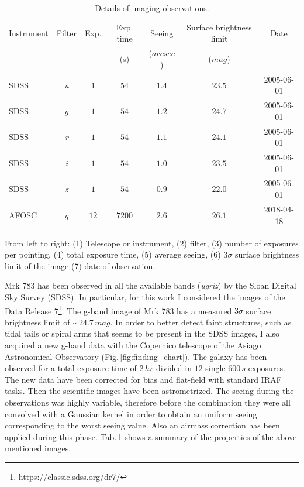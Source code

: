 \documentclass[../main.tex]{subfiles}
\begin{document}
\begin{table}
    \centering
    \caption{Details of imaging observations.}
    \label{tab:obs_image}
    \begin{threeparttable}
    \begin{tabular}{lcccccc}
    \hline
    \hline
    Instrument& Filter & Exp.& Exp. time & Seeing & Surface brightness limit & Date \\
    & & & (s) & ($\si{arcsec}$)& ($\si{mag}$)&\\   
    \hline
    SDSS &\emph{u}&$1$ &$54$ &$1.4$&$23.5$&2005-06-01\\
    SDSS &\emph{g}&$1$ &$54$ &$1.2$&$24.7$&2005-06-01\\
    SDSS &\emph{r}&$1$ &$54$ &$1.1$&$24.1$&2005-06-01\\
    SDSS &\emph{i}&$1$ &$54$ &$1.0$&$23.5$&2005-06-01\\
    SDSS &\emph{z}&$1$ &$54$ &$0.9$&$22.0$&2005-06-01\\
    AFOSC&\emph{g}&$12$&$7200$&$2.6$&$26.1$&2018-04-18\\
    \hline
    \end{tabular}
    \begin{tablenotes}
    \item From left to right: (1) Telescope or instrument, (2) filter, (3) number of exposures per pointing, (4) total exposure time, (5) average seeing, (6) $3\sigma$ surface brightness limit of the image (7) date of observation.
    \end{tablenotes}
    \end{threeparttable}
\end{table}

Mrk 783 has been observed in all the available bands (\emph{ugriz}) by the Sloan Digital Sky Survey (SDSS).
In particular, for this work I considered the images of the Data Release 7\footnote{\url{https://classic.sdss.org/dr7/}}.
The g-band image of Mrk 783 has a measured $3\sigma$ surface brightness limit of $\sim 24.7\,\si{mag}$.
In order to better detect faint structures, such as tidal tails or spiral arms that seems to be present in the SDSS images, I also acquired a new g-band data with the Copernico telescope of the Asiago Astronomical Observatory (Fig.\,\ref{fig:finding_chart}).
The galaxy has been observed for a total exposure time of $2\,\si{hr}$ divided in $12$ single $600\,\si{s}$ exposures. 
The new data have been corrected for bias and flat-field with standard IRAF tasks.
Then the scientific images have been astrometrized.
The seeing during the observations was highly variable, therefore before the combination they were all convolved with a Gaussian kernel in order to obtain an uniform seeing corresponding to the worst seeing value.
Also an airmass correction has been applied during this phase.
Tab.\,\ref{tab:obs_image} shows a summary of the properties of the above mentioned images.
\end{document}
